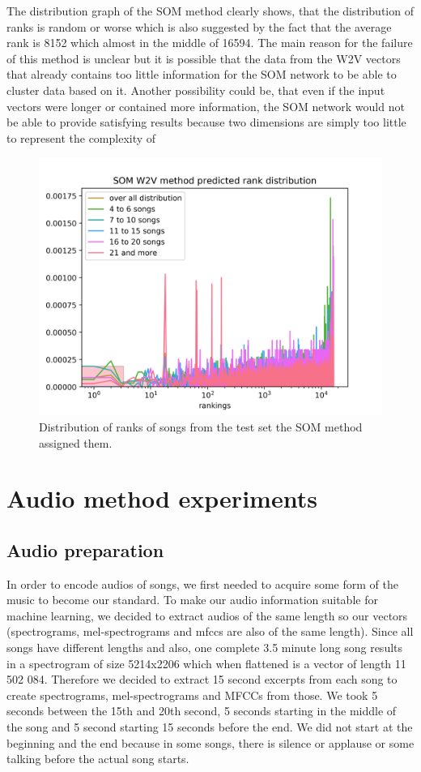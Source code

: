 The distribution graph of the SOM method clearly shows, that the distribution of ranks is random or worse which is also suggested by the fact that the average rank is 8152 which almost in the middle of 16594. The main reason for the failure of this method is unclear but it is possible that the data from the W2V vectors that already contains too little information for the SOM network to be able to cluster data based on it. Another possibility could be, that even if the input vectors were longer or contained more information, the SOM network would not be able to provide satisfying results because two dimensions are simply too little to represent the complexity of 
\begin{figure}[h]
    \centering
	\includegraphics[width=120mm]{./img/som_w2v_graph.png}
	\caption{Distribution of ranks of songs from the test set the SOM method assigned them.}
	\label{fig:som_distribution}
\end{figure}
\section{Audio method experiments}
\subsection{Audio preparation}\label{ssec:audio_prep}

In order to encode audios of songs, we first needed to acquire some form of the music to become our standard. To make our audio information suitable for machine learning, we decided to extract audios of the same length so our vectors (spectrograms, mel-spectrograms and mfccs are also of the same length). Since all songs have different lengths and also, one complete 3.5 minute long song results in a spectrogram of size 5214x2206 which when flattened is a vector of length 11 502 084. Therefore we decided to extract 15 second excerpts from each song to create spectrograms, mel-spectrograms and MFCCs from those. We took 5 seconds between the 15th and 20th second, 5 seconds starting in the middle of the song and 5 second starting 15 seconds before the end. We did not start at the beginning and the end because in some songs, there is silence or applause or some talking before the actual song starts. \\

